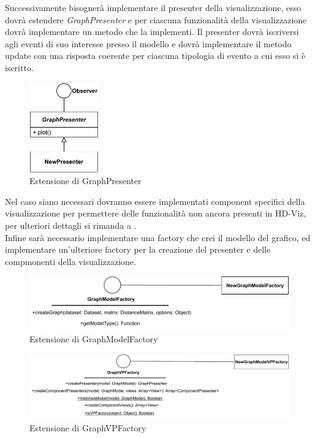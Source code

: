 \documentclass[../manuale_sviluppatore.tex]{subfiles}
\begin{document}
Successivamente bisognerà implementare il presenter della visualizzazione, esso dovrà estendere 
\emph{GraphPresenter} e per ciascuna funzionalità della visualizzazione dovrà implementare un metodo 
che la implementi. Il presenter dovrà iscriversi agli eventi di suo interesse presso il modello e 
dovrà implementare il metodo update con una risposta coerente per ciascuna tipologia di evento a cui 
esso si è iscritto.\\

\begin{figure}[H]
	\centering
	\includegraphics[width=3cm]{img/extendPresenter.pdf}
	\caption{Estensione di GraphPresenter}
\end{figure}


Nel caso siano necessari dovranno essere implementati component specifici della visualizzazione per 
permettere delle funzionalità non ancora presenti in HD-Viz, per ulteriori dettagli si rimanda a 
.\\

Infine sarà necessario implementare una factory che crei il modello del grafico, ed implementare 
un'ulteriore factory per la creazione del presenter e delle compmonenti della visualizzazione.

\begin{figure}[H]
	\centering
	\includegraphics[width=12cm]{img/extendModelFactory.pdf}
	\caption{Estensione di GraphModelFactory}
\end{figure}

\begin{figure}[H]
	\centering
	\includegraphics[width=15cm]{img/extendVPFactory.pdf}
	\caption{Estensione di GraphVPFactory}
\end{figure}
\end{document}
